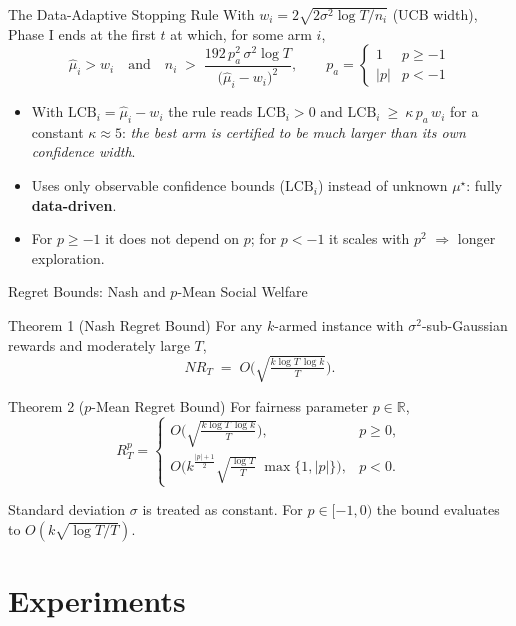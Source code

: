 \documentclass[11pt]{beamer}
\newcommand{\mus}{\mu^{\star}}
\newcommand{\LCB}{\mathrm{LCB}}
\begin{document}
\begin{frame}{The Data-Adaptive Stopping Rule}
  With $w_i=2\sqrt{2\sigma^2\log T/n_i}$ (UCB width), Phase I ends at the first $t$ at which, for some arm $i$,
  \[
    \widehat\mu_i> w_i
    \quad\text{and}\quad
    n_i\;>\;\frac{192\,p_a^{2}\,\sigma^2\log T}{\big(\widehat\mu_i-w_i\big)^{2}},
    \qquad
    p_a=\begin{cases}1 & p\ge -1\\ |p| & p<-1\end{cases}
  \]
  \begin{itemize}
    \item With $\LCB_i=\widehat\mu_i-w_i$ the rule reads $\LCB_i>0$ and
          $\LCB_i\ \ge\ \kappa\,p_a\,w_i$ for a constant $\kappa\approx 5$:
          \emph{the best arm is certified to be much larger than its own confidence width}.
    \item Uses only observable confidence bounds ($\LCB_i$) instead of unknown $\mus$: fully \textbf{data-driven}.
    \item For $p\ge -1$ it does not depend on $p$; for $p<-1$ it scales with $p^2$ $\Rightarrow$ longer exploration.
  \end{itemize}
\end{frame}

\begin{frame}{Regret Bounds: Nash and $p$-Mean Social Welfare}
  \begin{block}{Theorem 1 (Nash Regret Bound)}
    For any $k$-armed instance with $\sigma^2$-sub-Gaussian rewards and moderately large $T$,
    \[
      NR_T \;=\; O\!\Big(\sqrt{\tfrac{k\log T\,\log k}{T}}\Big).
    \]
  \end{block}
  \begin{block}{Theorem 2 ($p$-Mean Regret Bound)}
    For fairness parameter $p\in\mathbb{R}$,
    \[
      R_T^{p}=
      \begin{cases}
        O\!\Big(\sqrt{\tfrac{k\log T\,\log k}{T}}\Big), & p\ge0,\\[6pt]
        O\!\Big(k^{\frac{|p|+1}{2}}\sqrt{\tfrac{\log T}{T}}\;\max\{1,|p|\}\Big), & p<0 .
      \end{cases}
    \]
  \end{block}
  \small
  Standard deviation $\sigma$ is treated as constant. For $p\in[-1,0)$ the bound evaluates to $O(k\sqrt{\log T / T})$.
\end{frame}

\section{Experiments}
\end{document}
